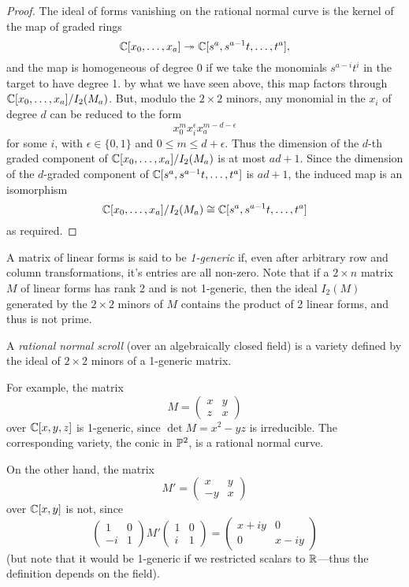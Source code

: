 \begin{proof}
The ideal of forms vanishing on the rational normal curve is the kernel of the map of graded rings
$$
\CC[x_{0},\dots, x_{a}] \twoheadrightarrow \CC[s^{a}, s^{a-1}t, \dots,t^{a}],
$$
and the map is homogeneous of degree 0 if we take the monomials $s^{a-i}t^{i}$ in the target to have 
degree 1. by what we have seen above, this map factors through 
$\CC[x_{0},\dots, x_{a}]/I_{2}(M_{a})$. But,
modulo the $2\times 2$ minors, any monomial in the $x_{i}$ of degree $d$ can be reduced to the form 
$$
x_{0}^{m} x_{i}^{\epsilon} x_{a}^{m-d-\epsilon}
$$
for some $i$, with $\epsilon\in \{0,1\}$ and $0\leq m\leq d+\epsilon$. Thus the dimension of the $d$-th graded
component of $\CC[x_{0},\dots, x_{a}]/I_{2}(M_{a})$ is at most $ad+1$. Since the dimension of the
$d$-graded component of $\CC[s^{a}, s^{a-1}t, \dots,t^{a}]$ is $ad+1$, the induced map is an isomorphism
$$
\CC[x_{0},\dots, x_{a}]/I_{2}(M_{a})\cong \CC[s^{a}, s^{a-1}t, \dots,t^{a}]
$$ 
as required.
\end{proof}

\begin{definition}
 A matrix of linear forms is said to be \emph{1-generic} if, even after arbitrary row and column transformations, it's entries are all non-zero. Note that if a $2\times n$ matrix
 $M$ of linear forms has rank 2 and is not 1-generic, then the ideal $I_2(M)$ generated by the $2\times 2$ minors of $M$ contains the product of 2 linear forms, and thus is not prime.
\end{definition}

\begin{definition}
A \emph{rational normal scroll} (over an algebraically closed field) is a variety defined by the ideal of $2\times 2$ minors
of a 1-generic matrix. 
\end{definition}
For example, the matrix 
$$
M = \begin{pmatrix}
 x &y\\
 z&x
\end{pmatrix}
$$
over $\CC[x,y,z]$ is  1-generic, since
$\det M = x^2-yz$ is irreducible. The corresponding variety, the conic in $\PP^2$,
is a rational normal curve.

On the other hand, the matrix
$$
M' = \begin{pmatrix}
 x &y\\
 -y&x
\end{pmatrix}
$$
over $\CC[x,y]$ is not, since
$$
\begin{pmatrix}
1&0\\
-i&1 
\end{pmatrix}
M'
\begin{pmatrix}
 1&0\\
 i&1
\end{pmatrix}
= 
\begin{pmatrix}
 x+iy&0\\
 0&x-iy
\end{pmatrix}
$$
(but note that it would be 1-generic if we restricted scalars to $\RR$---thus the definition depends on the field).

